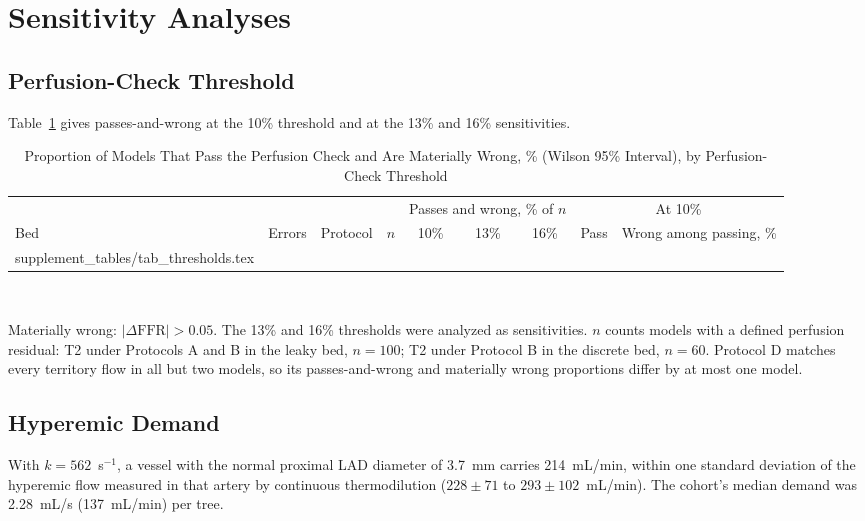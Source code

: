 \documentclass[journal,twoside,web,onecolumn]{ieeecolor}
\begin{document}
\FloatBarrier
{}
\section{Sensitivity Analyses}
\subsection{Perfusion-Check Threshold}
Table~\ref{tab:thr} gives passes-and-wrong at the 10\% threshold and at the 13\% and 16\% sensitivities.
\begin{table}[!ht]
\caption{Proportion of Models That Pass the Perfusion Check and Are Materially Wrong, \% (Wilson 95\% Interval), by
Perfusion-Check Threshold}\label{tab:thr}
\centering\footnotesize
\begin{tabular}{@{}lllrcccrc@{}}
\toprule
 & & & & \multicolumn{3}{c}{Passes and wrong, \% of $n$} & \multicolumn{2}{c}{At 10\%}\\
\cmidrule(lr){5-7}\cmidrule(l){8-9}
Bed & Errors & Protocol & $n$ & 10\% & 13\% & 16\% & Pass & Wrong among passing, \%\\
\midrule
{} supplement_tables/tab_thresholds.tex 
\bottomrule
\end{tabular}
\\[3pt]
\parbox{0.85\textwidth}{\footnotesize Materially wrong: $|\Delta\mathrm{FFR}| > 0.05$. The 13\% and 16\% thresholds were analyzed as sensitivities. $n$ counts models with a
defined perfusion residual: T2 under Protocols A and B in the leaky bed, $n = 100$; T2 under Protocol B in the
discrete bed, $n = 60$. Protocol D matches every territory flow in all but two models, so its passes-and-wrong and materially wrong proportions differ by at most one model.}
\end{table}

\FloatBarrier
{}
\subsection{Hyperemic Demand}\label{sec:demand}
With $k = 562$~s$^{-1}$, a vessel with the normal proximal LAD diameter of 3.7~mm carries 214~mL/min, within one standard deviation of the hyperemic flow measured in that artery by continuous thermodilution ($228 \pm 71$ to $293 \pm 102$~mL/min). The cohort's median demand was 2.28~mL/s (137~mL/min) per tree.


\FloatBarrier
{}
\end{document}

